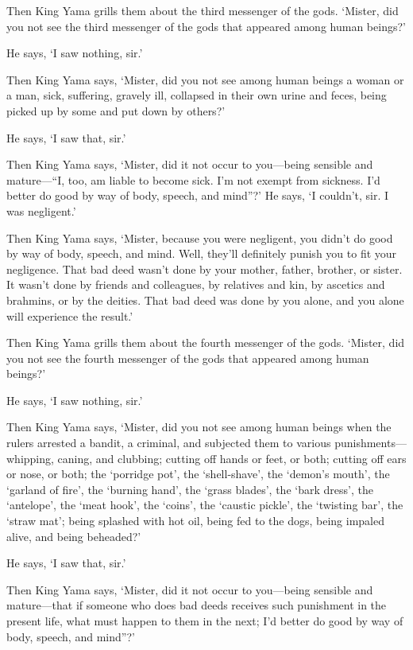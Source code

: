\documentclass[12pt,openany]{book}%
\begin{document}
Then King Yama grills them about the third messenger of the gods. ‘Mister, did you not see the third messenger of the gods that appeared among human beings?’ 

He says, ‘I saw nothing, sir.’ 

Then King Yama says, ‘Mister, did you not see among human beings a woman or a man, sick, suffering, gravely ill, collapsed in their own urine and feces, being picked up by some and put down by others?’ 

He says, ‘I saw that, sir.’ 

Then King Yama says, ‘Mister, did it not occur to you—being sensible and mature—“I, too, am liable to become sick. I’m not exempt from sickness. I’d better do good by way of body, speech, and mind”?’ He says, ‘I couldn’t, sir. I was negligent.’ 

Then King Yama says, ‘Mister, because you were negligent, you didn’t do good by way of body, speech, and mind. Well, they’ll definitely punish you to fit your negligence. That bad deed wasn’t done by your mother, father, brother, or sister. It wasn’t done by friends and colleagues, by relatives and kin, by ascetics and brahmins, or by the deities. That bad deed was done by you alone, and you alone will experience the result.’ 

Then King Yama grills them about the fourth messenger of the gods. ‘Mister, did you not see the fourth messenger of the gods that appeared among human beings?’ 

He says, ‘I saw nothing, sir.’ 

Then King Yama says, ‘Mister, did you not see among human beings when the rulers arrested a bandit, a criminal, and subjected them to various punishments—whipping, caning, and clubbing; cutting off hands or feet, or both; cutting off ears or nose, or both; the ‘porridge pot’, the ‘shell-shave’, the ‘demon’s mouth’, the ‘garland of fire’, the ‘burning hand’, the ‘grass blades’, the ‘bark dress’, the ‘antelope’, the ‘meat hook’, the ‘coins’, the ‘caustic pickle’, the ‘twisting bar’, the ‘straw mat’; being splashed with hot oil, being fed to the dogs, being impaled alive, and being beheaded?’ 

He says, ‘I saw that, sir.’ 

Then King Yama says, ‘Mister, did it not occur to you—being sensible and mature—that if someone who does bad deeds receives such punishment in the present life, what must happen to them in the next; I’d better do good by way of body, speech, and mind”?’ 
\end{document}
